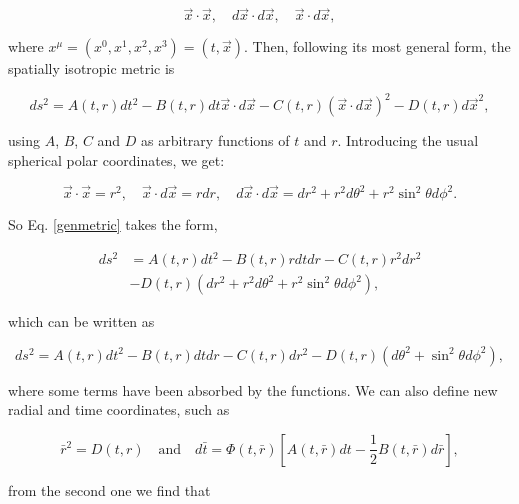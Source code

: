 \documentclass[letterpaper,11pt,onecolumn]{article}
\begin{document}
\begin{equation}
\vec{x} \cdot \vec{x}, \quad d \vec{x} \cdot d \vec{x}, \quad \vec{x} \cdot d \vec{x}\nonumber,
\end{equation}

where $x^\mu=(x^0,x^1,x^2,x^3)=(t,\vec{x})$. Then, following its most general form, the spatially isotropic metric is

\begin{equation}
d s^{2}=A(t, r) d t^{2}-B(t, r) d t \vec{x} \cdot d \vec{x}-C(t, r)(\vec{x} \cdot d \vec{x})^{2}-D(t, r) d \vec{x}^{2},
\label{genmetric}
\end{equation}

using $A$, $B$, $C$ and $D$ as arbitrary functions of $t$ and $r$. Introducing the usual spherical polar coordinates, we get:

\begin{equation}
\vec{x} \cdot \vec{x}=r^{2}, \quad \vec{x} \cdot d \vec{x}=r d r, \quad d \vec{x} \cdot d \vec{x}=d r^{2}+r^{2} d \theta^{2}+r^{2} \sin ^{2} \theta d \phi^{2}. \nonumber
\end{equation}

So Eq. \ref{genmetric} takes the form,

\begin{equation}
\begin{aligned}
d s^{2}&= A(t, r) d t^{2}-B(t, r) r d t d r-C(t, r) r^{2} d r^{2} \\
&-D(t, r)\left(d r^{2}+r^{2} d \theta^{2}+r^{2} \sin ^{2} \theta d \phi^{2} \right),
\end{aligned}\nonumber
\end{equation}

which can be written as 

\begin{equation}
d s^{2}=A(t, r) d t^{2}-B(t, r) d t d r-C(t, r) d r^{2}-D(t, r)\left(d \theta^{2}+\sin ^{2} \theta d \phi^{2}\right),
\label{genmet2}
\end{equation}

where some terms have been absorbed by the functions. We can also define new radial and time coordinates, such as 

\begin{equation}
\bar{r}^{2}=D(t, r) \quad \text{and} \quad d \bar{t}=\Phi(t, \bar{r})\left[A(t, \bar{r}) d t-\frac{1}{2} B(t, \bar{r}) d \bar{r}\right], \nonumber
\end{equation}

from the second one we find that 
\end{document}
